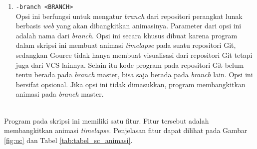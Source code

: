 \begin{enumerate}
\item \texttt{-branch <BRANCH>}\\
Opsi ini berfungsi untuk mengatur \textit{branch} dari repositori perangkat lunak berbasis \textit{web} yang akan dibangkitkan animasinya. Parameter dari opsi ini adalah nama dari \textit{branch}. Opsi ini secara khusus dibuat karena program dalam skripsi ini membuat animasi \textit{timelapse} pada suatu repositori Git, sedangkan Gource tidak hanya membuat visualisasi dari repositori Git tetapi juga dari VCS lainnya. Selain itu kode program pada repositori Git belum tentu berada pada \textit{branch} master, bisa saja berada pada \textit{branch} lain. Opsi ini bersifat opsional. Jika opsi ini tidak dimasukkan, program membangkitkan animasi pada \textit{branch} master.
\end{enumerate}
\ \\
  
 
Program pada skripsi ini memiliki satu fitur. Fitur tersebut adalah membangkitkan animasi \textit{timelapse}.
Penjelasan fitur dapat dilihat pada Gambar \ref{fig:uc} dan Tabel \ref{tab:tabel_sc_animasi}.



